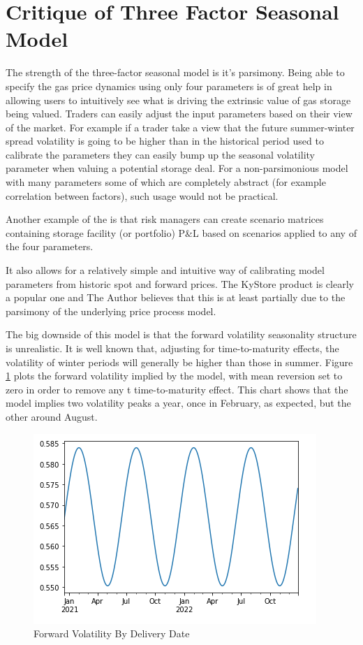 \documentclass{article}
\begin{document}
\section{Critique of Three Factor Seasonal Model}
The strength of the three-factor seasonal model is it's parsimony. 
Being able to specify the gas price dynamics using only four parameters is of great help
in allowing users to intuitively see what is driving the extrinsic value of gas storage
being valued. Traders can easily adjust the input
parameters based on their view of the market. For example if a trader take a view that 
the future summer-winter spread volatility is going to be higher than in the historical
period used to calibrate the parameters they can easily bump up the seasonal volatility
parameter when valuing a potential storage deal. For a non-parsimonious model with many parameters
some of which are completely abstract (for example correlation between factors), such
usage would not be practical.

Another example of the is that risk managers can 
create scenario matrices containing storage facility (or portfolio) P\&L based on scenarios 
applied to any of the four parameters. 


It also allows for a relatively simple and intuitive way of calibrating
model parameters from historic spot and forward prices.
The KyStore product is clearly a popular one and The Author believes that this is at least partially due 
to the parsimony of the underlying price process model.

\bigskip
The big downside of this model is that the forward volatility seasonality structure is unrealistic.
It is well known that, adjusting for time-to-maturity effects, the volatility of winter periods 
will generally be higher than those in summer. Figure \ref{fig:seasonal_vol} plots the forward
volatility implied by the model, with mean reversion set to zero in order to remove any t
time-to-maturity effect. This chart shows that the model implies two volatility peaks a
year, once in February, as expected, but the other around August.

\begin{figure}
    \includegraphics{vol_seasonality.png}
    \caption{Forward Volatility By Delivery Date}
    \label{fig:seasonal_vol}
\end{figure}




\end{document}
